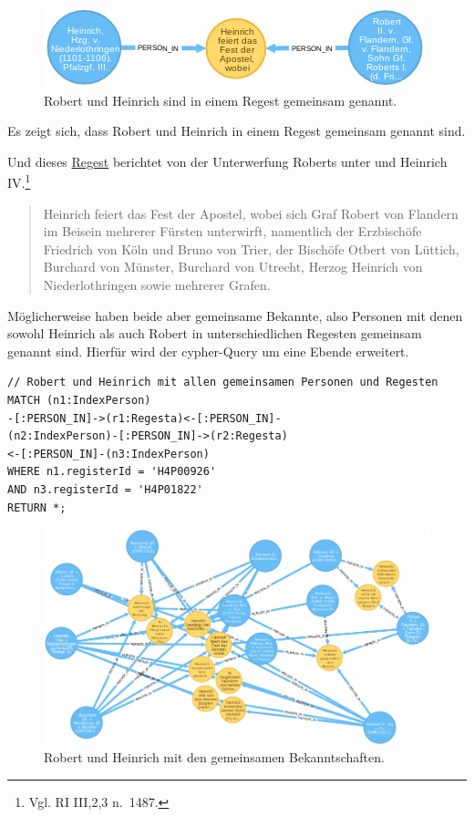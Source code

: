 \begin{figure}
\centering
\includegraphics{Bilder/RI2Graph/RobertundHeinrich.png}
\caption{Robert und Heinrich sind in einem Regest gemeinsam genannt.}
\end{figure}

Es zeigt sich, dass Robert und Heinrich in einem Regest gemeinsam
genannt sind.

Und dieses
\href{http://www.regesta-imperii.de/id/cf75356b-bd0d-4a67-8aeb-3ae27d1dcefa}{Regest}
berichtet von der Unterwerfung Roberts unter und Heinrich IV.\footnote{Vgl.
  RI III,2,3 n.~1487.}

\begin{quote}
Heinrich feiert das Fest der Apostel, wobei sich Graf Robert von
Flandern im Beisein mehrerer Fürsten unterwirft, namentlich der
Erzbischöfe Friedrich von Köln und Bruno von Trier, der Bischöfe Otbert
von Lüttich, Burchard von Münster, Burchard von Utrecht, Herzog Heinrich
von Niederlothringen sowie mehrerer Grafen.
\end{quote}

Möglicherweise haben beide aber gemeinsame Bekannte, also Personen mit
denen sowohl Heinrich als auch Robert in unterschiedlichen Regesten
gemeinsam genannt sind. Hierfür wird der cypher-Query um eine Ebende
erweitert.

\begin{verbatim}
// Robert und Heinrich mit allen gemeinsamen Personen und Regesten
MATCH (n1:IndexPerson)
-[:PERSON_IN]->(r1:Regesta)<-[:PERSON_IN]-
(n2:IndexPerson)-[:PERSON_IN]->(r2:Regesta)
<-[:PERSON_IN]-(n3:IndexPerson)
WHERE n1.registerId = 'H4P00926'
AND n3.registerId = 'H4P01822'
RETURN *;
\end{verbatim}

\begin{figure}
\centering
\includegraphics{Bilder/RI2Graph/RobertundHeinrichMitBrokern.png}
\caption{Robert und Heinrich mit den gemeinsamen Bekanntschaften.}
\end{figure}

